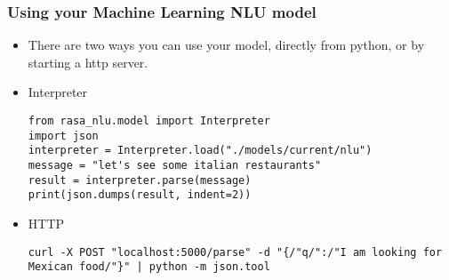  \begin{frame}[fragile]\frametitle{Using your Machine Learning NLU model}
\begin{itemize}
\item There are two ways you can use your model, directly from python, or by starting a http server. 
\item Interpreter
\begin{lstlisting}
from rasa_nlu.model import Interpreter
import json
interpreter = Interpreter.load("./models/current/nlu")
message = "let's see some italian restaurants"
result = interpreter.parse(message)
print(json.dumps(result, indent=2))
\end{lstlisting}
\item HTTP
\begin{lstlisting}
curl -X POST "localhost:5000/parse" -d "{/"q/":/"I am looking for Mexican food/"}" | python -m json.tool
\end{lstlisting}
\end{itemize}

\end{frame}
